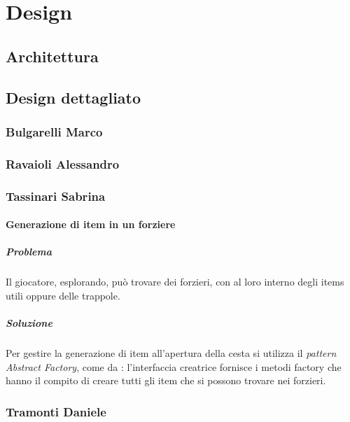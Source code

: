 \documentclass{report}
\begin{document}
\chapter{Design}

\section{Architettura}

\section{Design dettagliato}

\subsection{Bulgarelli Marco}

\subsection{Ravaioli Alessandro}

\subsection{Tassinari Sabrina}

\subsubsection{Generazione di item in un forziere}
\paragraph{Problema} Il giocatore, esplorando, può trovare dei forzieri, con al loro interno degli items utili oppure delle trappole. 

\paragraph{Soluzione} Per gestire la generazione di item all'apertura della cesta si utilizza il \textit{pattern Abstract Factory}, come da : 
%
l'interfaccia creatrice fornisce i metodi factory che hanno il compito di creare tutti gli item che si possono trovare nei forzieri.



\subsection{Tramonti Daniele}
\end{document}
